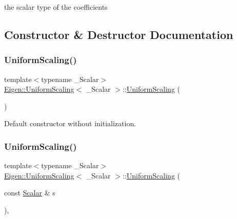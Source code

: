 the scalar type of the coefficients 

\subsection{Constructor \& Destructor Documentation}
\mbox{\label{class_eigen_1_1_uniform_scaling_ab17e233af501c69ff47c0dd16f43cc39}} 
\subsubsection{\texorpdfstring{UniformScaling()}{UniformScaling()}\hspace{0.1cm}{\footnotesize\ttfamily [1/3]}}
{\footnotesize\ttfamily template$<$typename \+\_\+\+Scalar$>$ \\
\mbox{\hyperlink{class_eigen_1_1_uniform_scaling}{Eigen\+::\+Uniform\+Scaling}}$<$ \+\_\+\+Scalar $>$\+::\mbox{\hyperlink{class_eigen_1_1_uniform_scaling}{Uniform\+Scaling}} (\begin{DoxyParamCaption}{ }\end{DoxyParamCaption})\hspace{0.3cm}{\ttfamily [inline]}}

Default constructor without initialization. \mbox{\label{class_eigen_1_1_uniform_scaling_a3a3e2fa318eb29c2c4f87e23a8a75144}} 
\subsubsection{\texorpdfstring{UniformScaling()}{UniformScaling()}\hspace{0.1cm}{\footnotesize\ttfamily [2/3]}}
{\footnotesize\ttfamily template$<$typename \+\_\+\+Scalar$>$ \\
\mbox{\hyperlink{class_eigen_1_1_uniform_scaling}{Eigen\+::\+Uniform\+Scaling}}$<$ \+\_\+\+Scalar $>$\+::\mbox{\hyperlink{class_eigen_1_1_uniform_scaling}{Uniform\+Scaling}} (\begin{DoxyParamCaption}\item[{const \mbox{\hyperlink{class_eigen_1_1_uniform_scaling_a04c4339f58f1210c5d4d34b1bd7ae283}{Scalar}} \&}]{s }\end{DoxyParamCaption})\hspace{0.3cm}{\ttfamily [inline]}, {\ttfamily [explicit]}}

